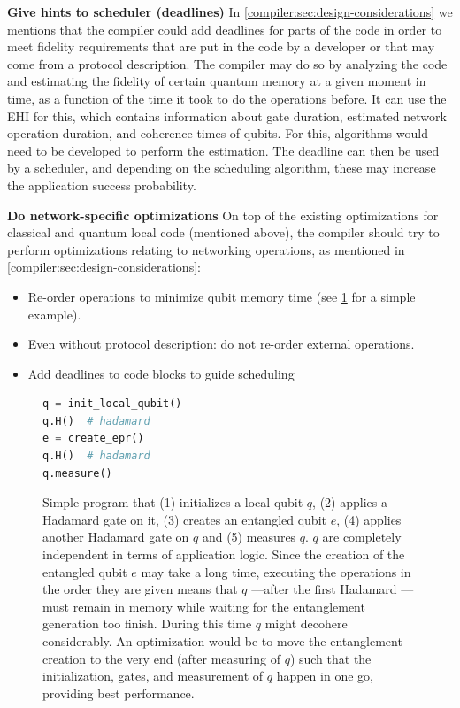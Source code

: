 \textbf{Give hints to scheduler (deadlines)}
In \cref{compiler:sec:design-considerations} we mentions that the compiler could add deadlines for parts of the code in order to meet fidelity requirements that are put in the code by a developer or that may come from a protocol description.
The compiler may do so by analyzing the code and estimating the fidelity of certain quantum memory at a given moment in time, as a function of the time it took to do the operations before.
It can use the \ac{EHI} for this, which contains information about gate duration, estimated network operation duration, and coherence times of qubits.
For this, algorithms would need to be developed to perform the estimation.
The deadline can then be used by a scheduler, and depending on the scheduling algorithm, these may increase the application success probability.

\textbf{Do network-specific optimizations}
On top of the existing optimizations for classical and quantum local code (mentioned above), the compiler should try to perform optimizations relating to networking operations, as mentioned in \cref{compiler:sec:design-considerations}:
\begin{itemize}
  \item Re-order operations to minimize qubit memory time (see \cref{compiler:lst:reorder-network-ops} for a simple example).
  \item Even without protocol description: do not re-order external operations.
  \item Add deadlines to code blocks to guide scheduling
\end{itemize}

\begin{figure}[t]
  \centering
  \begin{lstlisting}[language=Python]
q = init_local_qubit()
q.H()  # hadamard
e = create_epr()
q.H()  # hadamard
q.measure()
  \end{lstlisting}
  \caption{Simple program that (1) initializes a local qubit $q$, (2) applies a Hadamard gate on it, (3) creates an entangled qubit $e$, (4) applies another Hadamard gate on $q$ and (5) measures $q$.
  $q$ are completely independent in terms of application logic.
  Since the creation of the entangled qubit $e$ may take a long time, executing the operations in the order they are given means that $q$ ---after the first Hadamard --- must remain in memory while waiting for the entanglement generation too finish.
  During this time $q$ might decohere considerably.
  An optimization would be to move the entanglement creation to the very end (after measuring of $q$) such that the initialization, gates, and measurement of $q$ happen in one go, providing best performance.
  }
  \label{compiler:lst:reorder-network-ops}
\end{figure}


